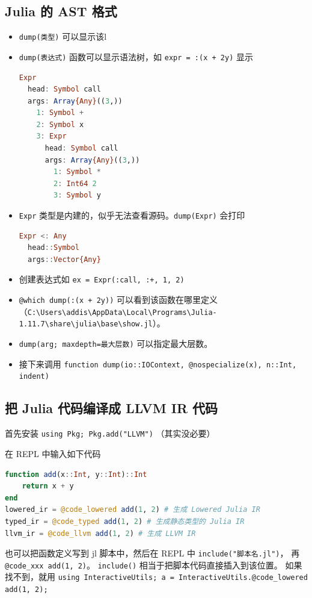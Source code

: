 \subsection{Julia 的 AST 格式}
\begin{itemize}
\item \verb`dump(类型)` 可以显示该l
\item \verb`dump(表达式)` 函数可以显示语法树，如 \verb`expr = :(x + 2y)` 显示
\begin{lstlisting}[language=julia]
Expr
  head: Symbol call
  args: Array{Any}((3,))
    1: Symbol +
    2: Symbol x
    3: Expr
      head: Symbol call
      args: Array{Any}((3,))
        1: Symbol *
        2: Int64 2
        3: Symbol y
\end{lstlisting}
\item \verb`Expr` 类型是内建的，似乎无法查看源码。\verb`dump(Expr)` 会打印 
\begin{lstlisting}[language=julia]
Expr <: Any
  head::Symbol
  args::Vector{Any}
\end{lstlisting}
\item 创建表达式如 \verb`ex = Expr(:call, :+, 1, 2)`
\item \verb`@which dump(:(x + 2y))` 可以看到该函数在哪里定义（\verb`C:\Users\addis\AppData\Local\Programs\Julia-1.11.7\share\julia\base\show.jl`）。
\item \verb`dump(arg; maxdepth=最大层数)` 可以指定最大层数。
\item 接下来调用 \verb`function dump(io::IOContext, @nospecialize(x), n::Int, indent)`
\end{itemize}


\subsection{把 Julia 代码编译成 LLVM IR 代码}
首先安装 \verb`using Pkg; Pkg.add("LLVM")` （其实没必要）

在 REPL 中输入如下代码
\begin{lstlisting}[language=julia,caption=julia]
function add(x::Int, y::Int)::Int
    return x + y
end
lowered_ir = @code_lowered add(1, 2) # 生成 Lowered Julia IR
typed_ir = @code_typed add(1, 2) # 生成静态类型的 Julia IR
llvm_ir = @code_llvm add(1, 2) # 生成 LLVM IR
\end{lstlisting}

也可以把函数定义写到 jl 脚本中，然后在 REPL 中 \verb`include("脚本名.jl")`， 再 \verb`@code_xxx add(1, 2)`。 \verb`include()` 相当于把脚本代码直接插入到该位置。 如果找不到，就用 \verb`using InteractiveUtils; a = InteractiveUtils.@code_lowered add(1, 2);`

